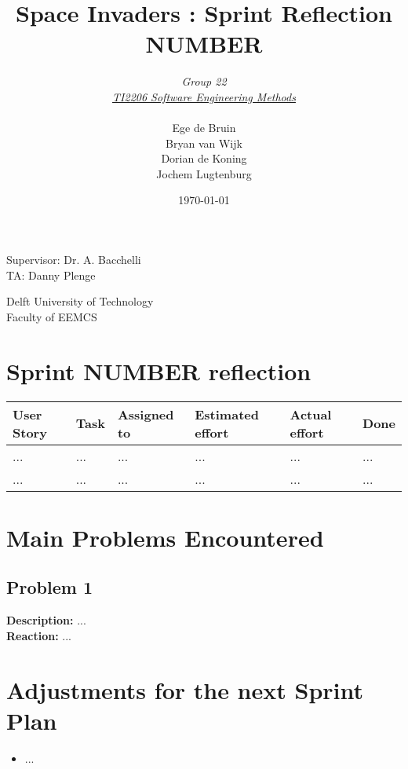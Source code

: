 \documentclass[10pt]{article}
\begin{document}
\title{Space Invaders : Sprint Reflection NUMBER}
\date{\today}
\author{\textit{Group 22}\\ \textit{\underline{TI2206 Software Engineering Methods}} \\
 \\Ege de Bruin \\ Bryan van Wijk \\ Dorian de Koning \\ Jochem Lugtenburg }
 \maketitle  
 \begin{center}
Supervisor: Dr. A. Bacchelli\\
TA: Danny Plenge\\
 \end{center}     
 \begin{center}
 Delft University of Technology\\
 Faculty of EEMCS\\
 \end{center}
 \thispagestyle{empty}
 \pagebreak

\section*{Sprint NUMBER reflection}

\begin{center}

    \hspace*{-3cm}\begin{tabular}{ | p{2cm} | p{9cm} | p{2cm} | p{1.8cm} | p{1.8cm} | p{1cm} |}
    \hline
    User Story & Task & Assigned to & Estimated effort & Actual effort & Done \\ \hline
    ... & ... & ... & ... & ... & ...\\ 
    ... & ... & ... & ... & ... & ...\\ \hline    
    \end{tabular}
\end{center}

\section*{Main Problems Encountered}
\subsection*{Problem 1}
\textbf{Description:}
...\\
\textbf{Reaction:} 
...


\section*{Adjustments for the next Sprint Plan}
\begin{itemize}
\item ...
\end{itemize}
\end{document}
